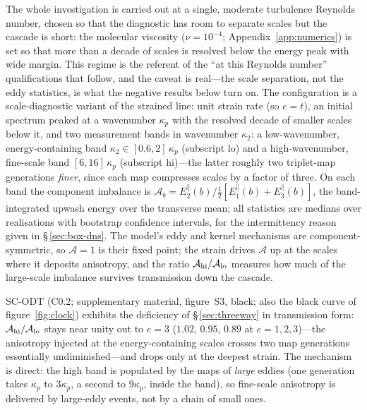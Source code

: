 \documentclass[lineno]{JFM-FLM_Au}
\begin{document}
The whole investigation is carried out at a single, moderate turbulence
Reynolds number, chosen so that the diagnostic has room to separate scales
but the cascade is short: the molecular viscosity
($\nu=10^{-4}$; Appendix~\ref{app:numerics}) is set so that more than a
decade of scales is resolved below the energy peak with wide margin. This
regime is the referent of the ``at this Reynolds number'' qualifications
that follow, and the caveat is real---the scale separation, not the eddy
statistics, is what the negative results below turn on.
The configuration is a scale-diagnostic variant of the strained line: unit
strain rate (so $e=t$), an initial spectrum peaked at a wavenumber
$\kappa_p$ with the resolved decade of smaller scales below it, and two
measurement bands in wavenumber $\kappa_2$: a low-wavenumber,
energy-containing band $\kappa_2\in[0.6,2]\,\kappa_p$ (subscript
$\mathrm{lo}$) and a high-wavenumber, fine-scale band
$[6,16]\,\kappa_p$ (subscript $\mathrm{hi}$)---the latter roughly two
triplet-map generations \emph{finer}, since each map compresses scales
by a factor of three. On each band the
component imbalance is
$\mathcal A_b = E^{\|}_2(b)/\tfrac12[E^{\|}_1(b)+E^{\|}_3(b)]$, the
band-integrated upwash energy over the transverse mean; all statistics are
medians over realisations with bootstrap confidence intervals, for the
intermittency reason given in \S\,\ref{sec:box-dns}. The model's eddy and
kernel mechanisms are component-symmetric, so $\mathcal A=1$ is their
fixed point; the strain drives $\mathcal A$ up at the scales where it
deposits anisotropy, and the ratio
$\mathcal A_{\rm hi}/\mathcal A_{\rm lo}$ measures how much of the
large-scale imbalance survives transmission down the cascade.

SC-ODT (C0.2; supplementary material, figure~S3, black; also the black curve of figure~\ref{fig:clock}) exhibits the deficiency of
\S\,\ref{sec:threeway} in transmission form:
$\mathcal A_{\rm hi}/\mathcal A_{\rm lo}$ stays near unity out to $e=3$
($1.02$, $0.95$, $0.89$ at $e=1,2,3$)---the anisotropy injected at the
energy-containing scales crosses two map generations essentially
undiminished---and drops only at the deepest strain. The mechanism is
direct: the high band is populated by the maps of \emph{large} eddies
(one generation takes $\kappa_p$ to $3\kappa_p$, a second to $9\kappa_p$,
inside the band), so fine-scale anisotropy is delivered by large-eddy
events, not by a chain of small ones.
\end{document}
